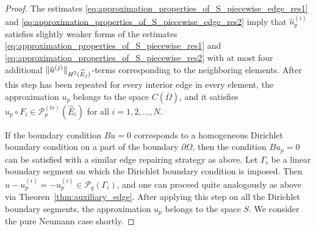 \documentclass[english, 12pt, a4paper, sci, utf8, a-2b, online]{aaltothesis}
\theoremstyle{definition}
\theoremstyle{plain}
\DeclarePairedDelimiter\norm{\lVert}{\rVert}
\numberwithin{equation}{section}
\begin{document}
\begin{proof}
    The estimates \eqref{eq:approximation_properties_of_S_piecewise_edge_res1}
    and \eqref{eq:approximation_properties_of_S_piecewise_edge_res2}
    imply that $\hat{u}_p^{(i)}$ satisfies slightly weaker forms of the estimates 
    \eqref{eq:approximation_properties_of_S_piecewise_res1}
    and \eqref{eq:approximation_properties_of_S_piecewise_res2}
    with at most four additional
    $\norm{\hat{u}^{(j)}}_{H^2(\widehat{E}_j)}$-terms
    corresponding to the neighboring elements.
    After this step has been repeated for every interior edge in every element,
    the approximation $u_p$ belongs to the space $C(\overline{\Omega})$,
    and it satisfies $u_p \circ F_i \in \mathcal{P}_p^{(tr)}(\widehat{E}_i)$
    for all $i=1,2,\dotsc,N$.

    If the boundary condition $Bu=0$ corresponds to a homogeneous Dirichlet
    boundary condition on a part of the boundary $\partial \Omega$,
    then the condition $Bu_p = 0$ can be satisfied with a similar
    edge repairing strategy as above. Let $\Gamma_i$ be a linear boundary segment
    on which the Dirichlet boundary condition is imposed.
    Then $u - u_p^{(i)} = -u_p^{(i)} \in \mathcal{P}_q(\Gamma_i)$,
    and one can proceed quite analogously as above via
    Theoren~\ref{thm:auxiliary_edge}. After applying this step on all
    the Dirichlet boundary segments, the approximation $u_p$
    belongs to the space $S$. We consider the pure Neumann case shortly.


\end{proof}
\end{document}
